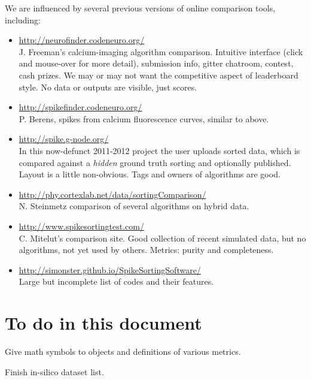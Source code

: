 \documentclass[10pt]{article}
\newcommand{\bi}{\begin{itemize}}
\newcommand{\ei}{\end{itemize}}
\begin{document}
We are influenced by several previous versions of online
comparison tools, including:
\bi
\item \url{http://neurofinder.codeneuro.org/}\\
  J. Freeman's calcium-imaging algorithm comparison.
  Intuitive interface (click and mouse-over for more detail), submission info,
  gitter chatroom, contest, cash prizes.
  We may or may not want the competitive aspect of leaderboard style.
  No data or outputs are visible, just scores.
\item \url{http://spikefinder.codeneuro.org/}\\
  P. Berens, spikes from calcium fluorescence curves, similar to above.
\item \url{http://spike.g-node.org/}\\
  In this now-defunct
  2011-2012 project the user
  uploads sorted data, which is compared against a {\em hidden} ground truth sorting and optionally published. Layout is a little non-obvious.
  Tags and owners of algorithms are good.
\item \url{http://phy.cortexlab.net/data/sortingComparison/}\\
  N. Steinmetz comparison of several algorithms on hybrid data.
\item \url{http://www.spikesortingtest.com/}\\
  C. Mitelut's comparison site. Good collection of recent
  simulated data, but
  no algorithms, not yet used by others. Metrics: purity and completeness.
\item \url{http://simonster.github.io/SpikeSortingSoftware/}\\
  Large but incomplete list of codes and their features.
\ei

\section{To do in this document}

Give math symbols to objects and definitions of various metrics.

Finish in-silico dataset list.




\end{document}
